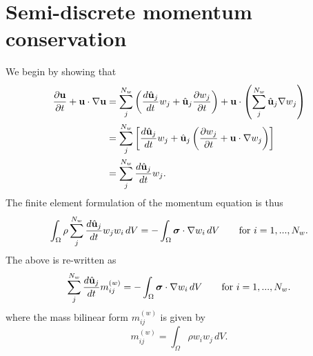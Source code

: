 \documentclass[11pt]{article}
\begin{document}
\section{Semi-discrete momentum conservation}
We begin by showing that
\begin{align}
    \frac{\partial \mathbf{u}}{\partial t} + \mathbf{u} \cdot \nabla \mathbf{u} &= \sum_j^{N_w} \left ( \frac{d \hat{\mathbf{u}}_j}{d t} w_j + \hat{\mathbf{u}}_j \frac{\partial w_j}{\partial t} \right ) + \mathbf{u} \cdot \left ( \sum_j^{N_w} \hat{\mathbf{u}}_j \nabla w_j \right ) \nonumber \\
    &= \sum_j^{N_w} \left [ \frac{d \hat{\mathbf{u}}_j}{d t} w_j + \hat{\mathbf{u}}_j \left ( \frac{\partial w_j}{\partial t} + \mathbf{u} \cdot \nabla w_j \right ) \right ] \nonumber \\
    &= \sum_j^{N_w} \frac{d \hat{\mathbf{u}}_j}{d t} w_j.
\end{align}
The finite element formulation of the momentum equation is thus 
\begin{equation}
    \int_\Omega \rho \sum_j^{N_w} \frac{d \hat{\mathbf{u}}_j}{d t} w_j w_i \, dV = -\int_\Omega \bm \sigma \cdot \nabla w_i \, dV \qquad \text{for } i = 1,...,N_w.
\end{equation}
The above is re-written as
\begin{equation}
    \label{eq:semi_discrete_momentum_bilinear}
    \sum_j^{N_w} \frac{d \hat{\mathbf{u}}_j}{d t} m^{(w)}_{ij} = -\int_\Omega \bm \sigma \cdot \nabla w_i \, dV \qquad \text{for } i = 1,...,N_w.
\end{equation}
where the mass bilinear form $m^{(w)}_{ij}$ is given by 
\begin{equation}
    m^{(w)}_{ij} = \int_\Omega \rho w_i w_j \, dV.
\end{equation}
\end{document}
